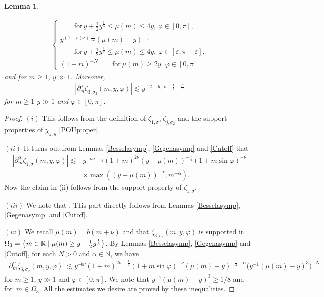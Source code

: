 \documentclass[10pt,a4paper]{amsart}
\numberwithin{equation}{section}
\newtheorem{Lemma}[Theorem]{Lemma}
\def\R{\mathbb{R}}%
\def\a{\alpha}
\def\e{\varepsilon}
\def\f{\varphi}
\def\m{\mu}
\def\n{\nu}
\def\s{\sigma}
\def\z{\zeta}
\def\pa{\partial}
\begin{document}
\begin{Lemma}
\begin{itemize}
\begin{align*}
\begin{cases}
\qquad \text{for}\  y+\frac{1}{2}y^{\frac{1}{3}}\leq \m(m)\leq 4y,\  \f\in [0,\pi],\\
y^{(1-b)\n+\frac{1}{12}}(\m(m)-y)^{-\frac{5}{4}}\\
\qquad \text{for}\  y+\frac{1}{2}y^{\frac{1}{3}}\leq \m(m)\leq 4y,\  \f\in [\e,\pi-\e],\\
(1+m)^{-N}\qquad \text{for}\  \m(m)\geq 2y,\  \f\in [0,\pi]
\end{cases}
\end{align*}
and for $m\geq 1$, $y\gg 1$. Moreover,
\begin{align*}
|\pa_{m}^{\a}\z_{3,\s_2}(m,y,\f)|\lesssim y^{(2-b)\n-\frac{1}{4}-\frac{\a}{3}}
\end{align*}
for $m\geq 1$ $y\gg 1$ and $\f\in [0,\pi]$.
\end{itemize}
\end{Lemma}

\begin{proof}
 $(i)$ This follows from the definition of $\z_{1,\s}$, $\z_{j,\s_2}$ and the support properties of $\chi_{j,y}$ \eqref{POUproper}.

$(ii)$ It turns out from Lemmas \ref{Besselasymp}, \ref{Gegenasymp} and \ref{Cutoff} that
\begin{align*}
|\pa_{m}^{\a}\z_{1,\s}(m,y,\f)|\lesssim {}&y^{-b\n-\frac{1}{4}}(1+m)^{2\n}(y-\m(m))^{-\frac{1}{4}}(1+m\sin \f)^{-\n}\\
&\times \max((y-\m(m))^{-\a}, m^{-\a}).
\end{align*}
Now the claim in (ii) follows from the support property of $\z_{1,\s}$.

 $(iii)$ We note that \smash{$\Omega_2=\big\{m\in\R\mid y-2y^{\frac{1}{3}}\leq \m(m)\leq y+2y^{\frac{1}{3}}\big\}$}. This part directly follows from Lemmas \ref{Besselasymp}, \ref{Gegenasymp} and \ref{Cutoff}.

 $(iv)$ We recall $\m(m)=b(m+\n)$ and that $\z_{3,\s_2}(m,y,\f)$ is supported in $\Omega_3=\big\{m\in\R\mid \m(m)\geq y+\smash{\frac{1}{2}y^{\frac{1}{3}}}\big\}$.
By Lemmas \ref{Besselasymp}, \ref{Gegenasymp} and \ref{Cutoff}, for each $N>0$ and $\a\in\mathbb{N}$, we have
\begin{align*}
|\pa_{m}^{\a}\z_{3,\s_2}(m,y,\f)|\lesssim y^{-b\n}(1+m)^{2\n-\frac{1}{4}}(1+m\sin \f)^{-\n}(\m(m)-y)^{-\frac{1}{4}-\a}\bigl(y^{-1}(\m(m)-y)^3\bigr)^{-N}
\end{align*}
for $m\geq 1$, $y\gg 1$ and $\f\in [0,\pi]$. We note that $y^{-1}(\m(m)-y)^3\geq 1/8$ and \smash{$\m(m)-y\geq \frac{1}{2}y^{\frac{1}{3}}$} for~${m\in \Omega_3}$. All the estimates we desire are proved by these inequalities.
\end{proof}
\end{document}
